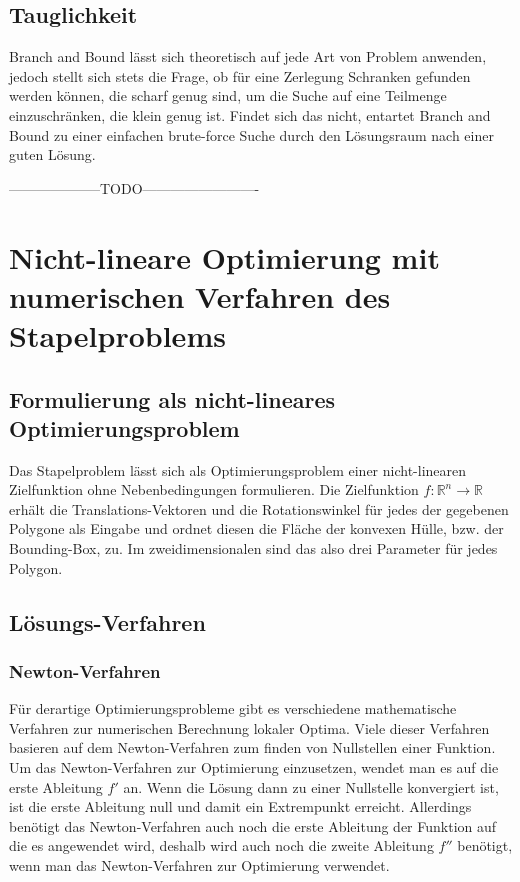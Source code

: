 \documentclass[runningheads,a4paper]{llncs}
\begin{document}
\subsection{Tauglichkeit}

Branch and Bound lässt sich theoretisch auf jede Art von Problem anwenden, jedoch stellt sich stets die Frage, ob für eine Zerlegung Schranken gefunden werden können, die scharf genug sind, um die Suche auf eine Teilmenge einzuschränken, die klein genug ist. 
Findet sich das nicht, entartet Branch and Bound zu einer einfachen brute-force Suche durch den Lösungsraum nach einer guten Lösung.

--------------------TODO-------------------------

\section{Nicht-lineare Optimierung mit numerischen Verfahren des Stapelproblems}

\subsection{Formulierung als nicht-lineares Optimierungsproblem}
\label{formObjStacking}
Das Stapelproblem lässt sich als Optimierungsproblem einer nicht-linearen Zielfunktion ohne Nebenbedingungen formulieren. Die Zielfunktion ${f: \mathbb{R}^n \rightarrow \mathbb{R}}$ erhält die Translations-Vektoren und die Rotationswinkel für jedes der gegebenen Polygone als Eingabe und ordnet diesen die Fläche der konvexen Hülle, bzw. der Bounding-Box, zu. Im zweidimensionalen sind das also drei Parameter für jedes Polygon.

\subsection{Lösungs-Verfahren}
\label{sec:uncon_nonlin_opt}

\subsubsection{Newton-Verfahren}

Für derartige Optimierungsprobleme gibt es verschiedene mathematische Verfahren zur numerischen Berechnung lokaler Optima. Viele dieser Verfahren basieren auf dem Newton-Verfahren zum finden von Nullstellen einer Funktion. Um das Newton-Verfahren zur Optimierung einzusetzen, wendet man es auf die erste Ableitung $f'$ an. Wenn die Lösung dann zu einer Nullstelle konvergiert ist, ist die erste Ableitung null und damit ein Extrempunkt erreicht. Allerdings benötigt das Newton-Verfahren auch noch die erste Ableitung der Funktion auf die es angewendet wird, deshalb wird auch noch die zweite Ableitung $f''$ benötigt, wenn man das Newton-Verfahren zur Optimierung verwendet.
\end{document}
